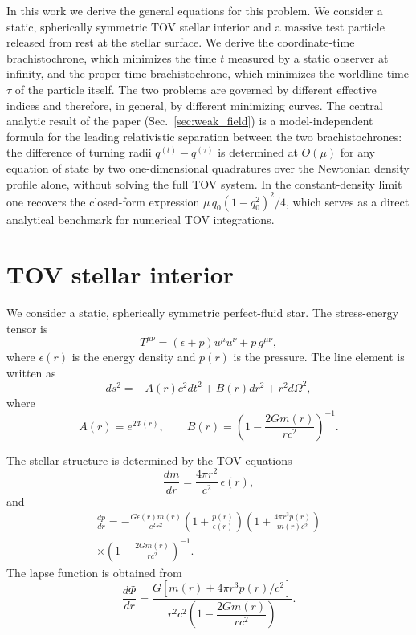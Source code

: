 \documentclass[
  aps,
  prd,
  twocolumn,
  nofootinbib,
  superscriptaddress,
  longbibliography
]{revtex4-2}
\begin{document}
In this work we derive the general equations for this problem. We
consider a static, spherically symmetric TOV stellar interior and a
massive test particle released from rest at the stellar surface. We
derive the coordinate-time brachistochrone, which minimizes the time
$t$ measured by a static observer at infinity, and the proper-time
brachistochrone, which minimizes the worldline time $\tau$ of the
particle itself. The two problems are governed by different effective
indices and therefore, in general, by different minimizing curves. The
central analytic result of the paper (Sec.~\ref{sec:weak_field}) is a
model-independent formula for the leading relativistic separation
between the two brachistochrones: the difference of turning radii
$q^{(t)}-q^{(\tau)}$ is determined at $O(\mu)$ for any equation of
state by two one-dimensional quadratures over the Newtonian density
profile alone, without solving the full TOV system. In the
constant-density limit one recovers the closed-form expression
$\mu\,q_0(1-q_0^2)^2/4$, which serves as a direct analytical
benchmark for numerical TOV integrations.

\section{TOV stellar interior}

We consider a static, spherically symmetric perfect-fluid star. The
stress-energy tensor is
\begin{equation}
T^{\mu\nu}
=
\left(\epsilon+p\right)u^\mu u^\nu
+
p\,g^{\mu\nu},
\end{equation}
where $\epsilon(r)$ is the energy density and $p(r)$ is the pressure.
The line element is written as
\begin{equation}
ds^2
=
-A(r)c^2dt^2
+
B(r)dr^2
+
r^2d\Omega^2,
\label{eq:metric_AB}
\end{equation}
where
\begin{equation}
A(r)=e^{2\Phi(r)},
\qquad
B(r)=
\left(
1-\frac{2Gm(r)}{rc^2}
\right)^{-1}.
\end{equation}

The stellar structure is determined by the TOV
equations~\cite{Tolman1939,OppenheimerVolkoff1939}
\begin{equation}
\frac{dm}{dr}
=
\frac{4\pi r^2}{c^2}\,\epsilon(r),
\label{eq:tov_mass}
\end{equation}
and
\begin{multline}
\frac{dp}{dr}
=
-
\frac{G\epsilon(r)m(r)}{c^2r^2}
\left(
1+\frac{p(r)}{\epsilon(r)}
\right)
\left(
1+\frac{4\pi r^3p(r)}{m(r)c^2}
\right)
\\
\times
\left(
1-\frac{2Gm(r)}{rc^2}
\right)^{-1}.
\label{eq:tov_pressure}
\end{multline}
The lapse function is obtained from
\begin{equation}
\frac{d\Phi}{dr}
=
\frac{
G\left[
m(r)+4\pi r^3p(r)/c^2
\right]
}{
r^2c^2
\left(
1-\dfrac{2Gm(r)}{rc^2}
\right)
}.
\label{eq:tov_lapse}
\end{equation}
\end{document}
